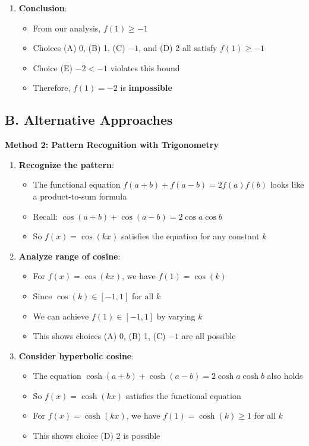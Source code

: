 \documentclass[12pt]{article}
\begin{document}
\begin{solutionbox}
\begin{enumerate}[leftmargin=*]
    \item \textbf{Conclusion}: 
    \begin{itemize}
        \item From our analysis, $f(1) \geq -1$
        \item Choices (A) 0, (B) 1, (C) $-1$, and (D) 2 all satisfy $f(1) \geq -1$
        \item Choice (E) $-2 < -1$ violates this bound
        \item Therefore, $f(1) = -2$ is \textbf{impossible}
    \end{itemize}
\end{enumerate}

\subsection*{B. Alternative Approaches}

\textbf{Method 2: Pattern Recognition with Trigonometry}

\begin{enumerate}
    \item \textbf{Recognize the pattern}:
    \begin{itemize}
        \item The functional equation $f(a+b) + f(a-b) = 2f(a)f(b)$ looks like a product-to-sum formula
        \item Recall: $\cos(a+b) + \cos(a-b) = 2\cos a \cos b$
        \item So $f(x) = \cos(kx)$ satisfies the equation for any constant $k$
    \end{itemize}
    
    \item \textbf{Analyze range of cosine}:
    \begin{itemize}
        \item For $f(x) = \cos(kx)$, we have $f(1) = \cos(k)$
        \item Since $\cos(k) \in [-1, 1]$ for all $k$
        \item We can achieve $f(1) \in [-1, 1]$ by varying $k$
        \item This shows choices (A) 0, (B) 1, (C) $-1$ are all possible
    \end{itemize}
    
    \item \textbf{Consider hyperbolic cosine}:
    \begin{itemize}
        \item The equation $\cosh(a+b) + \cosh(a-b) = 2\cosh a \cosh b$ also holds
        \item So $f(x) = \cosh(kx)$ satisfies the functional equation
        \item For $f(x) = \cosh(kx)$, we have $f(1) = \cosh(k) \geq 1$ for all $k$
        \item This shows choice (D) 2 is possible
    \end{itemize}
    

\end{enumerate}
\end{solutionbox}
\end{document}
